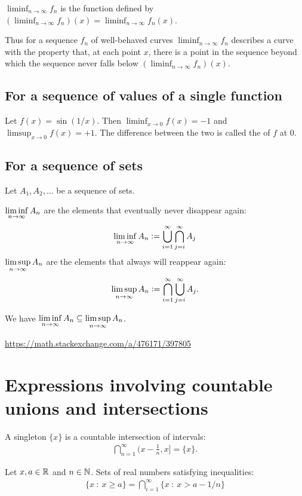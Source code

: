 $\liminf_{n\to\infty} f_n$ is the function defined by $(\liminf_{n\to\infty} f_n)(x) = \liminf_{n\to\infty} f_n(x)$.

Thus for a sequence $f_n$ of well-behaved curves $\liminf_{n\to\infty} f_n$ describes a curve with the property
that, at each point $x$, there is a point in the sequence beyond which the sequence never falls
below $(\liminf_{n\to\infty} f_n)(x)$.

\subsection{For a sequence of values of a single function}
Let $f(x) = \sin(1/x)$. Then $\liminf_{x \to 0} f(x) = -1$ and $\limsup_{x\to 0} f(x) = +1$. The difference
between the two is called the  of $f$ at $0$.

\subsection{For a sequence of sets}

Let $A_1, A_2, \ldots$ be a sequence of sets.

$\liminfn A_n$ are the elements that eventually never disappear again:
\begin{align*}
  \liminfn A_n := \bigcup_{i=1}^\infty \bigcap_{j=i}^\infty A_j
\end{align*}
$\limsupn A_n$ are the elements that always will reappear again:
\begin{align*}
  \limsupn A_n := \bigcap_{i=1}^\infty \bigcup_{j=i}^\infty A_j.
\end{align*}

We have $\liminfn A_n \subseteq \limsupn A_n$.

\url{https://math.stackexchange.com/a/476171/397805}


\section*{Expressions involving countable unions and intersections}

A singleton $\{x\}$ is a countable intersection of intervals:
    \begin{align*}
      \bigcap_{n=1}^\infty \Big(x -\frac{1}{n}, x\Big] = \{x\}.
    \end{align*}

Let $x, a \in \mathbb{R}$ and $n \in \mathbb{N}$. Sets of real numbers satisfying inequalities:
\begin{align*}
  \big\{x ~:~ x \geq a\big\} = \bigcap_{i=1}^\infty \big\{x ~:~ x > a - 1/n\big\}
\end{align*}

